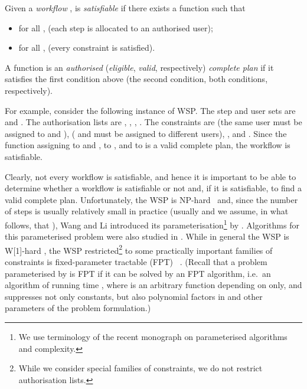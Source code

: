 \documentclass[runningheads,proof]{llncs}
\begin{document}
Given a \emph{workflow} ,  is \emph{satisfiable} if there exists a function  such that
\begin{itemize}
\item for all ,  (each step is allocated to an authorised user);
\item for all ,  (every constraint is satisfied).
\end{itemize}
A function  is an \emph{authorised} (\emph{eligible}, \emph{valid}, respectively) \emph{complete plan} if it satisfies the first condition above (the second condition, both conditions, respectively).



For example, consider the following instance of WSP\@.
The step and user sets are  and . 
The authorisation lists are , , , . 
The constraints are  (the same user must be assigned to  and ),  ( and  must be assigned to different users),  , and . 
Since the function  assigning  to  and ,  to , and  to  is a valid complete plan, the workflow is satisfiable.  

Clearly, not every workflow is satisfiable, and hence
it is important to be able to determine whether a workflow is satisfiable or not and, if it is satisfiable, to find a valid complete plan.
Unfortunately, the WSP is  NP-hard~\cite{WaLi10} and, since the number  of steps is usually relatively small in practice (usually  and we assume, in what follows, that ), Wang and Li \cite{WaLi10} introduced its parameterisation\footnote{We use terminology of the recent monograph \cite{DoFe13} on parameterised algorithms and complexity.}  by . Algorithms for this parameterised problem were also studied in \cite{FAW2014,CoCrGaGuJo13,JOCO2014,CrGuYe13}. While in general the WSP is W[1]-hard \cite{WaLi10}, 
the WSP restricted\footnote{While we consider special families of constraints, we do not restrict authorisation lists.} to some practically important families of constraints is fixed-parameter tractable (FPT) ~\cite{CoCrGaGuJo13,CrGuYe13,WaLi10}. (Recall that a problem parameterised by  is FPT if it can be solved by an FPT algorithm, i.e.\ an algorithm of running time , where  is an arbitrary function depending on  only, and  suppresses not only constants, but also polynomial factors in  and other parameters of the problem formulation.)
\end{document}

